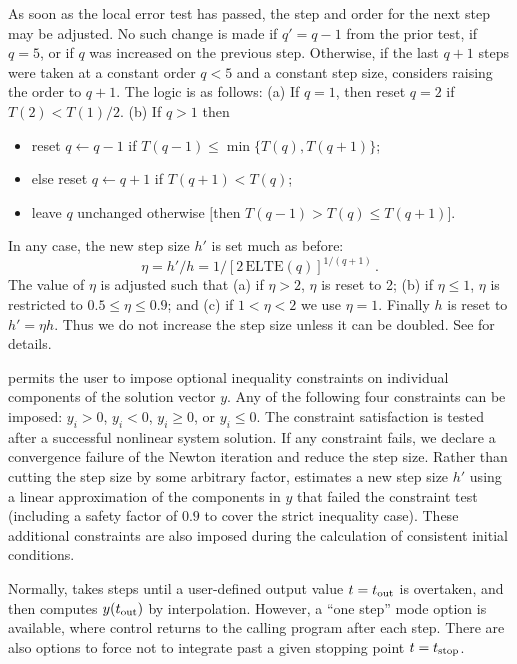 As soon as the local error test has passed, the step and order for the
next step may be adjusted.  No such change is made if $q' = q-1$ from
the prior test, if $q = 5$, or if $q$ was increased on the previous
step.  Otherwise, if the last $q+1$ steps were taken at a constant
order $q < 5$ and a constant step size, {\ida} considers raising the order
to $q+1$.  The logic is as follows: (a) If $q = 1$, then reset $q = 2$
if $T(2) < T(1)/2$.  (b) If $q > 1$ then 
\begin{itemize}
\item reset $q \leftarrow q-1$ if $T(q-1) \leq \min\{T(q),T(q+1)\}$;
\item else reset $q \leftarrow q+1$ if $T(q+1) < T(q)$;
\item leave $q$ unchanged otherwise $[$then $T(q-1) > T(q) \leq T(q+1)]$.
\end{itemize}
In any case, the new step size $h'$ is set much as before:
\[ \eta = h'/h = 1/[2 \, \mbox{ELTE}(q)]^{1/(q+1)} \, . \]
The value of $\eta$ is adjusted such that (a) if $\eta > 2$, $\eta$ is
reset to 2; (b) if $\eta \leq 1$, $\eta$ is restricted to 
$0.5 \leq \eta \leq 0.9$; and (c) if $1 < \eta < 2$ we use $\eta = 1$.
Finally $h$ is reset to $h' = \eta h$.  Thus we do not increase the
step size unless it can be doubled.  See \cite{BCP:96} for details.

{\ida} permits the user to impose optional inequality constraints on individual 
components of the solution vector $y$. Any of the following four constraints 
can be imposed: $y_i > 0$, $y_i < 0$, $y_i \geq 0$, or $y_i \leq 0$. 
The constraint satisfaction is tested after a successful nonlinear system solution. 
If any constraint fails, we declare a convergence failure of the Newton iteration 
and reduce the step size. Rather than cutting the step size by some arbitrary factor, 
{\ida} estimates a new step size $h'$ using a linear approximation of the components 
in $y$ that failed the constraint test (including a safety factor of $0.9$ to 
cover the strict inequality case). These additional constraints are also imposed
during the calculation of consistent initial conditions.

Normally, {\ida} takes steps until a user-defined output value $t =
t_{\mbox{\scriptsize out}}$ is overtaken, and then computes
$y(t_{\mbox{\scriptsize out}})$ by interpolation.  However, a
``one step'' mode option is available, where control returns to the
calling program after each step.  There are also options to force {\ida}
not to integrate past a given stopping point $t = t_{\mbox{\scriptsize
stop}}$.


